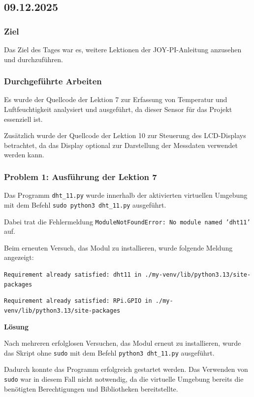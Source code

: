 \subsection{09.12.2025}

\subsubsection{Ziel}

Das Ziel des Tages war es, weitere Lektionen der JOY-PI-Anleitung
anzusehen und durchzuführen.

\subsubsection{Durchgeführte Arbeiten}

Es wurde der Quellcode der Lektion 7 zur Erfassung von Temperatur und
Luftfeuchtigkeit analysiert und ausgeführt, da dieser Sensor für das
Projekt essenziell ist.

Zusätzlich wurde der Quellcode der Lektion 10 zur Steuerung des
LCD-Displays betrachtet, da das Display optional zur Darstellung der
Messdaten verwendet werden kann.

\subsubsection{Problem 1: Ausführung der Lektion 7}

Das Programm \texttt{dht\_11.py} wurde innerhalb der aktivierten
virtuellen Umgebung mit dem Befehl
\texttt{sudo python3 dht\_11.py} ausgeführt.

Dabei trat die Fehlermeldung
\texttt{ModuleNotFoundError: No module named 'dht11'} auf.

Beim erneuten Versuch, das Modul zu installieren, wurde folgende
Meldung angezeigt:

\texttt{Requirement already satisfied: dht11 in ./my-venv/lib/python3.13/site-packages}

\texttt{Requirement already satisfied: RPi.GPIO in ./my-venv/lib/python3.13/site-packages}

\textbf{Lösung}

Nach mehreren erfolglosen Versuchen, das Modul erneut zu installieren,
wurde das Skript ohne \texttt{sudo} mit dem Befehl
\texttt{python3 dht\_11.py} ausgeführt.

Dadurch konnte das Programm erfolgreich gestartet werden.
Das Verwenden von \texttt{sudo} war in diesem Fall nicht notwendig,
da die virtuelle Umgebung bereits die benötigten Berechtigungen und
Bibliotheken bereitstellte.

